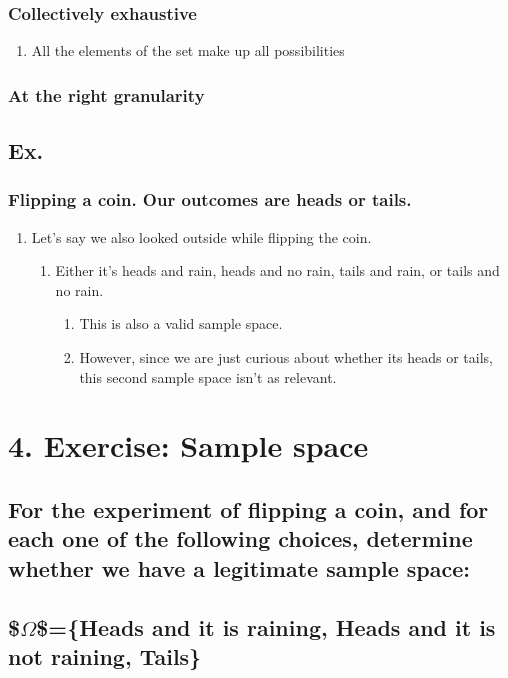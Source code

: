 \documentclass[11pt]{article}
\begin{document}
\subsubsection{Collectively exhaustive}
\label{sec:orgc035f8b}
\begin{enumerate}
\item All the elements of the set make up all possibilities
\label{sec:orgafe132f}
\end{enumerate}
\subsubsection{At the right granularity}
\label{sec:org146988f}
\subsection{Ex.}
\label{sec:org09f2e7f}
\subsubsection{Flipping a coin. Our outcomes are heads or tails.}
\label{sec:org45a784e}
\begin{enumerate}
\item Let's say we also looked outside while flipping the coin.
\label{sec:org39018db}
\begin{enumerate}
\item Either it's heads and rain, heads and no rain, tails and rain, or tails and no rain.
\label{sec:org5f341cf}
\begin{enumerate}
\item This is also a valid sample space.
\label{sec:orgc09a553}
\item However, since we are just curious about whether its heads or tails, this second sample space isn't as relevant.
\label{sec:org0f0a07d}
\end{enumerate}
\end{enumerate}
\end{enumerate}
\section{4. Exercise: Sample space}
\label{sec:org2f17348}
\subsection{For the experiment of flipping a coin, and for each one of the following choices, determine whether we have a legitimate sample space:}
\label{sec:org3371012}
\subsection{\$\(\Omega\)\$=\{Heads and it is raining, Heads and it is not raining, Tails\}}
\label{sec:orgf2001b9}
\end{document}
